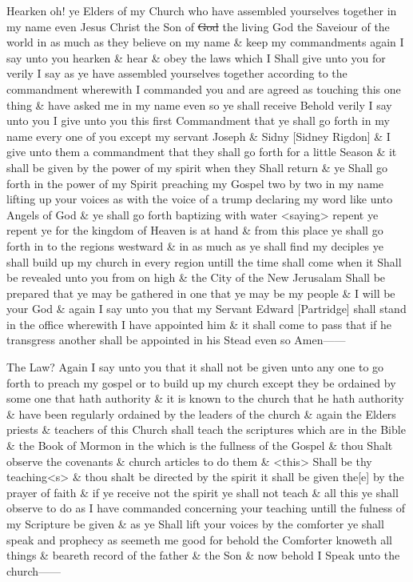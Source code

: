 				Hearken oh! ye Elders of my Church who have assembled yourselves together in my name even Jesus Christ the Son of \sout{God} the living God the Saveiour of the world in as much as they believe on my name \& keep my commandments again I say unto you hearken \& hear \& obey the laws which I Shall give unto you for verily I say as ye have assembled yourselves together according to the commandment wherewith I commanded you and are agreed as touching this one thing \& have asked me in my name even so ye shall receive Behold verily I say unto you I give unto you this first Commandment that ye shall go forth in my name every one of you except my servant Joseph \& Sidny [Sidney Rigdon] \& I give unto them a commandment that they shall go forth for a little Season \& it shall be given by the power of my spirit when they Shall return \& ye Shall go forth in the power of my Spirit preaching my Gospel two by two in my name lifting up your voices as with the voice of a trump declaring my word like unto Angels of God \& ye shall go forth baptizing with water <saying> repent ye repent ye for the kingdom of Heaven is at hand \& from this place ye shall go forth in to the regions westward \& in as much as ye shall find my deciples ye shall build up my church in every region untill the time shall come when it Shall be revealed unto you from on high \& the City of the New Jerusalam Shall be prepared that ye may be gathered in one that ye may be my people \& I will be your God \& again I say unto you that my Servant Edward [Partridge] shall stand in the office wherewith I have appointed him \& it shall come to pass that if he transgress another shall be appointed in his Stead even so Amen------

				The Law? Again I say unto you that it shall not be given unto any one to go forth to preach my gospel or to build up my church except they be ordained by some one that hath authority \& it is known to the church that he hath authority \& have been regularly ordained by the leaders of the church \& again the Elders priests \& teachers of this Church shall teach the scriptures which are in the Bible \& the Book of Mormon in the which is the fullness of the Gospel \& thou Shalt observe the covenants \& church articles to do them \& <this> Shall be thy teaching<s> \& thou shalt be directed by the spirit it shall be given the[e] by the prayer of faith \& if ye receive not the spirit ye shall not teach \& all this ye shall observe to do as I have commanded concerning your teaching untill the fulness of my Scripture be given \& as ye Shall lift your voices by the comforter ye shall speak and prophecy as seemeth me good for behold the Comforter knoweth all things \& beareth record of the father \& the Son \& now behold I Speak unto the church------
				
